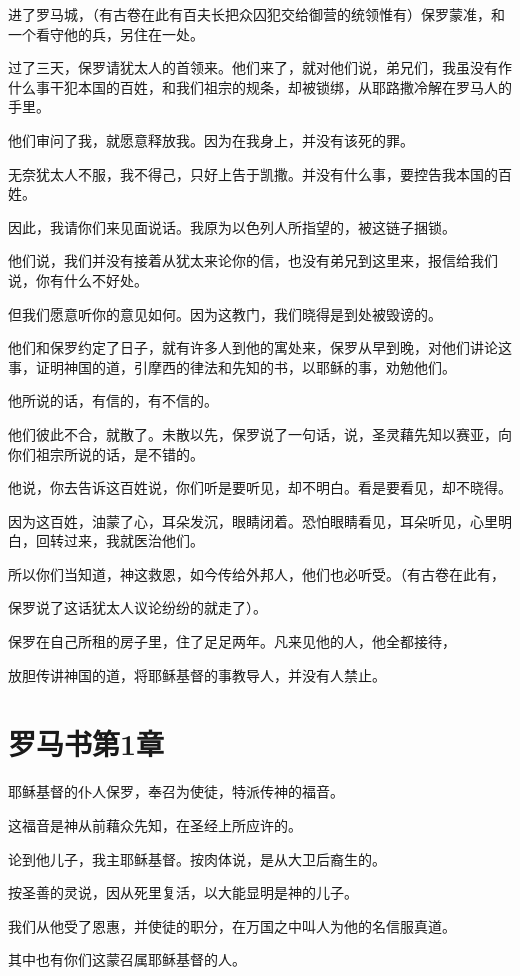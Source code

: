 \documentclass[12pt,oneside]{book}
\begin{document}
进了罗马城，（有古卷在此有百夫长把众囚犯交给御营的统领惟有）保罗蒙准，和一个看守他的兵，另住在一处。

过了三天，保罗请犹太人的首领来。他们来了，就对他们说，弟兄们，我虽没有作什么事干犯本国的百姓，和我们祖宗的规条，却被锁绑，从耶路撒冷解在罗马人的手里。

他们审问了我，就愿意释放我。因为在我身上，并没有该死的罪。

无奈犹太人不服，我不得己，只好上告于凯撒。并没有什么事，要控告我本国的百姓。

因此，我请你们来见面说话。我原为以色列人所指望的，被这链子捆锁。

他们说，我们并没有接着从犹太来论你的信，也没有弟兄到这里来，报信给我们说，你有什么不好处。

但我们愿意听你的意见如何。因为这教门，我们晓得是到处被毁谤的。

他们和保罗约定了日子，就有许多人到他的寓处来，保罗从早到晚，对他们讲论这事，证明神国的道，引摩西的律法和先知的书，以耶稣的事，劝勉他们。

他所说的话，有信的，有不信的。

他们彼此不合，就散了。未散以先，保罗说了一句话，说，圣灵藉先知以赛亚，向你们祖宗所说的话，是不错的。

他说，你去告诉这百姓说，你们听是要听见，却不明白。看是要看见，却不晓得。

因为这百姓，油蒙了心，耳朵发沉，眼睛闭着。恐怕眼睛看见，耳朵听见，心里明白，回转过来，我就医治他们。

所以你们当知道，神这救恩，如今传给外邦人，他们也必听受。（有古卷在此有，

保罗说了这话犹太人议论纷纷的就走了）。

保罗在自己所租的房子里，住了足足两年。凡来见他的人，他全都接待，

放胆传讲神国的道，将耶稣基督的事教导人，并没有人禁止。

\chapter{罗马书第1章}
耶稣基督的仆人保罗，奉召为使徒，特派传神的福音。

这福音是神从前藉众先知，在圣经上所应许的。

论到他儿子，我主耶稣基督。按肉体说，是从大卫后裔生的。

按圣善的灵说，因从死里复活，以大能显明是神的儿子。

我们从他受了恩惠，并使徒的职分，在万国之中叫人为他的名信服真道。

其中也有你们这蒙召属耶稣基督的人。
\end{document}
